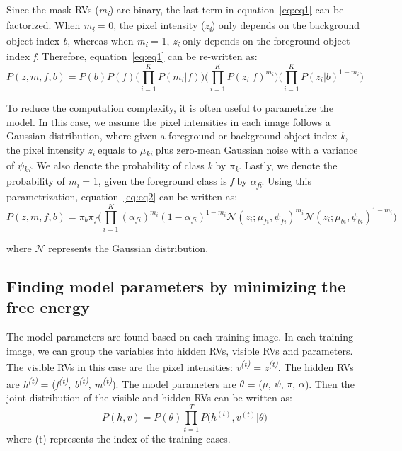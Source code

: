 \documentclass{article} %
\begin{document}
Since the mask RVs (\textit{m}\textsubscript{\textit{i}}) are binary, the last term in equation~\ref{eq:eq1} can be factorized. When \textit{m}\textsubscript{\textit{i}} = 0, the pixel intensity (\textit{z}\textsubscript{\textit{i}}) only depends on the background object index \textit{b}, whereas when \textit{m}\textsubscript{\textit{i}} = 1, \textit{z}\textsubscript{\textit{i}} only depends on the foreground object index \textit{f}. Therefore, equation~\ref{eq:eq1} can be re-written as:
\begin{equation}
P(z,m,f,b) = P(b)P(f)\Bigg( \prod_{i=1}^KP(m_{i}|f)\Bigg)\Bigg( \prod_{i=1}^KP(z_{i}|f)^{m_{i}}\Bigg)\Bigg( \prod_{i=1}^KP(z_{i}|b)^{1-m_{i}}\Bigg)
\label{eq:eq2}
\end{equation}

To reduce the computation complexity, it is often useful to parametrize the model. In this case, we assume the pixel intensities in each image follows a Gaussian distribution, where given a foreground or background object index \textit{k}, the pixel intensity \textit{z}\textsubscript{\textit{i}} equals to \textit{$\mu$}\textsubscript{\textit{ki}} plus zero-mean Gaussian noise with a variance of \textit{$\psi$}\textsubscript{\textit{ki}}. We also denote the probability of class \textit{k} by \textit{$\pi$}\textsubscript{\textit{k}}. Lastly, we denote the probability of \textit{m}\textsubscript{\textit{i}} = 1, given the foreground class is \textit{f} by \textit{$\alpha$}\textsubscript{\textit{fi}}. Using this parametrization, equation~\ref{eq:eq2} can be written as:
\begin{equation}
P(z,m,f,b) = \pi_{b} \pi_{f} \Bigg( \prod_{i=1}^K {(\alpha_{fi})}^{m_{i}} {(1-\alpha_{fi})}^{1-m_{i}} \mathcal{N}(z_i;\mu_{fi},\psi_{fi})^{m_{i}}\mathcal{N}(z_i;\mu_{bi},\psi_{bi})^{1-m_{i}} \Bigg)
\label{eq:eq3}
\end{equation}

where $\mathcal{N}$ represents the Gaussian distribution. 

\subsection{Finding model parameters by minimizing the free energy}
\label{free_energy}
The model parameters are found based on each training image. In each training image, we can group the variables into hidden RVs, visible RVs and parameters. The visible RVs in this case are the pixel intensities: \textit{v}\textsuperscript{\textit{(t)}} = \textit{z}\textsuperscript{\textit{(t)}}. The hidden RVs are \textit{h}\textsuperscript{\textit{(t)}} = (\textit{f}\textsuperscript{\textit{(t)}}, \textit{b}\textsuperscript{\textit{(t)}}, \textit{m}\textsuperscript{\textit{(t)}}). The model parameters are \textit{$\theta$} = (\textit{$\mu$}, \textit{$\psi$}, \textit{$\pi$}, \textit{$\alpha$}). Then the joint distribution of the visible and hidden RVs can be written as:
\begin{equation}
P(h,v) = P(\theta) \prod_{t=1}^TP\Big(h^{(t)}, v^{(t)}|\theta\Big) 
\label{eq:eq4}
\end{equation}
where (t) represents the index of the training cases.
\end{document}
